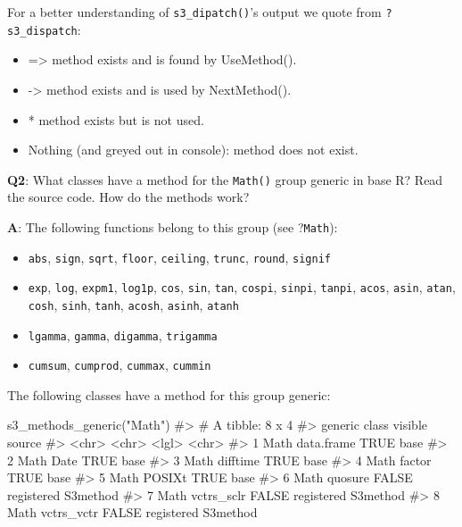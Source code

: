 \documentclass[
]{krantz}
\makeatletter
\newenvironment{Shaded}{\begin{snugshade}}{\end{snugshade}}
\newcommand{\CommentTok}[1]{\textcolor[rgb]{0.56,0.35,0.01}{\textit{#1}}}
\newcommand{\KeywordTok}[1]{\textcolor[rgb]{0.13,0.29,0.53}{\textbf{#1}}}
\newcommand{\NormalTok}[1]{#1}
\newcommand{\StringTok}[1]{\textcolor[rgb]{0.31,0.60,0.02}{#1}}
\providecommand{\tightlist}{%
  \setlength{\itemsep}{0pt}\setlength{\parskip}{0pt}}
\newenvironment{kframe}{%
\medskip{}
\setlength{\fboxsep}{.8em}
 \def\at@end@of@kframe{}%
 \ifinner\ifhmode%
  \def\at@end@of@kframe{\end{minipage}}%
  \begin{minipage}{\columnwidth}%
 \fi\fi%
 \def\FrameCommand##1{\hskip\@totalleftmargin \hskip-\fboxsep
 \colorbox{shadecolor}{##1}\hskip-\fboxsep
     \hskip-\linewidth \hskip-\@totalleftmargin \hskip\columnwidth}%
 \MakeFramed {\advance\hsize-\width
   \@totalleftmargin\z@ \linewidth\hsize
   \@setminipage}}%
 {\par\unskip\endMakeFramed%
 \at@end@of@kframe}
\renewenvironment{Shaded}{\begin{kframe}}{\end{kframe}}
\renewcommand{\KeywordTok} [1]{\textcolor[rgb]{0.00,0.44,0.13}{{#1}}}
\renewcommand{\StringTok}  [1]{\textcolor[rgb]{0.25,0.44,0.63}{{#1}}}
\renewcommand{\CommentTok} [1]{\textcolor[rgb]{0.38,0.63,0.69}{{#1}}}
\renewcommand{\NormalTok}  [1]{{#1}}
\makeatother
\begin{document}
For a better understanding of \texttt{s3\_dipatch()}'s output we quote from \texttt{?s3\_dispatch}:

\begin{itemize}
\tightlist
\item
  =\textgreater{} method exists and is found by UseMethod().
\item
  -\textgreater{} method exists and is used by NextMethod().
\item
  * method exists but is not used.
\item
  Nothing (and greyed out in console): method does not exist.
\end{itemize}

\textbf{{Q2}}: What classes have a method for the \texttt{Math()} group generic in base R? Read the source code. How do the methods work?

\textbf{{A}}: The following functions belong to this group (see ?\texttt{Math}):

\begin{itemize}
\tightlist
\item
  \texttt{abs}, \texttt{sign}, \texttt{sqrt}, \texttt{floor}, \texttt{ceiling}, \texttt{trunc}, \texttt{round}, \texttt{signif}
\item
  \texttt{exp}, \texttt{log}, \texttt{expm1}, \texttt{log1p}, \texttt{cos}, \texttt{sin}, \texttt{tan}, \texttt{cospi}, \texttt{sinpi}, \texttt{tanpi}, \texttt{acos}, \texttt{asin}, \texttt{atan}, \texttt{cosh}, \texttt{sinh}, \texttt{tanh}, \texttt{acosh}, \texttt{asinh}, \texttt{atanh}
\item
  \texttt{lgamma}, \texttt{gamma}, \texttt{digamma}, \texttt{trigamma}
\item
  \texttt{cumsum}, \texttt{cumprod}, \texttt{cummax}, \texttt{cummin}
\end{itemize}

The following classes have a method for this group generic:

\begin{Shaded}
\begin{Highlighting}[]
\KeywordTok{s3_methods_generic}\NormalTok{(}\StringTok{"Math"}\NormalTok{)}
\CommentTok{#> # A tibble: 8 x 4}
\CommentTok{#>   generic class      visible source             }
\CommentTok{#>   <chr>   <chr>      <lgl>   <chr>              }
\CommentTok{#> 1 Math    data.frame TRUE    base               }
\CommentTok{#> 2 Math    Date       TRUE    base               }
\CommentTok{#> 3 Math    difftime   TRUE    base               }
\CommentTok{#> 4 Math    factor     TRUE    base               }
\CommentTok{#> 5 Math    POSIXt     TRUE    base               }
\CommentTok{#> 6 Math    quosure    FALSE   registered S3method}
\CommentTok{#> 7 Math    vctrs_sclr FALSE   registered S3method}
\CommentTok{#> 8 Math    vctrs_vctr FALSE   registered S3method}
\end{Highlighting}
\end{Shaded}
\end{document}
